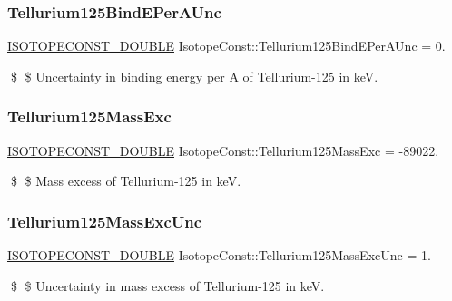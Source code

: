 \subsubsection{\texorpdfstring{Tellurium125\+Bind\+E\+Per\+A\+Unc}{Tellurium125BindEPerAUnc}}
{\footnotesize\ttfamily \mbox{\hyperlink{group___isotope_const-_macros_ga8f45a7272ce02c0b4c65c44636ed719a}{I\+S\+O\+T\+O\+P\+E\+C\+O\+N\+S\+T\+\_\+\+D\+O\+U\+B\+LE}} Isotope\+Const\+::\+Tellurium125\+Bind\+E\+Per\+A\+Unc = 0.}

\$ \$ Uncertainty in binding energy per A of Tellurium-\/125 in keV. \mbox{\label{group___isotope_const-_tellurium-_te125_gafbf1d0b90bfa932ca4b53e2489e1c852}} 
\subsubsection{\texorpdfstring{Tellurium125\+Mass\+Exc}{Tellurium125MassExc}}
{\footnotesize\ttfamily \mbox{\hyperlink{group___isotope_const-_macros_ga8f45a7272ce02c0b4c65c44636ed719a}{I\+S\+O\+T\+O\+P\+E\+C\+O\+N\+S\+T\+\_\+\+D\+O\+U\+B\+LE}} Isotope\+Const\+::\+Tellurium125\+Mass\+Exc = -\/89022.}

\$ \$ Mass excess of Tellurium-\/125 in keV. \mbox{\label{group___isotope_const-_tellurium-_te125_gabbc8d60340298edb46e873854b7493cd}} 
\subsubsection{\texorpdfstring{Tellurium125\+Mass\+Exc\+Unc}{Tellurium125MassExcUnc}}
{\footnotesize\ttfamily \mbox{\hyperlink{group___isotope_const-_macros_ga8f45a7272ce02c0b4c65c44636ed719a}{I\+S\+O\+T\+O\+P\+E\+C\+O\+N\+S\+T\+\_\+\+D\+O\+U\+B\+LE}} Isotope\+Const\+::\+Tellurium125\+Mass\+Exc\+Unc = 1.}

\$ \$ Uncertainty in mass excess of Tellurium-\/125 in keV. \mbox{\label{group___isotope_const-_tellurium-_te125_gac7b6463e38ec9553df78b642fa772021}} 
